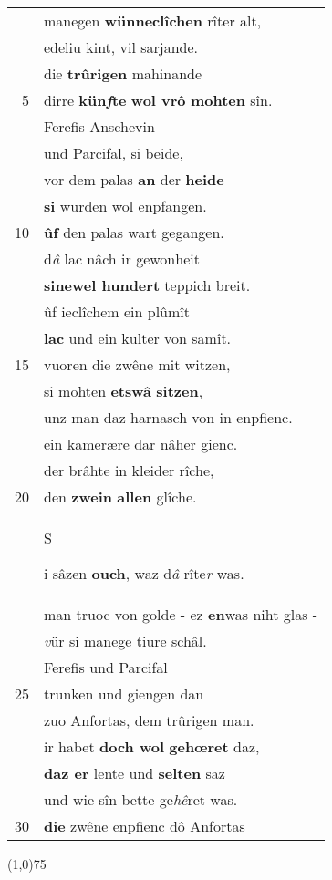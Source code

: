 \documentclass[8pt,a4paper,notitlepage]{article}
\begin{document}
\begin{table}[ht]
\begin{minipage}[t]{0.5\linewidth}
\begin{tabular}{rl}
 & manegen \textbf{wünneclîchen} rîter alt,\\ 
 & edeliu kint, vil sarjande.\\ 
 & die \textbf{trûrigen} mahinande\\ 
5 & dirre \textbf{kün\textit{f}te} \textbf{wol vrô} \textbf{mohten} sîn.\\ 
 & Ferefis Anschevin\\ 
 & und Parcifal, si beide,\\ 
 & vor dem palas \textbf{an} der \textbf{heide}\\ 
 & \textbf{si} wurden wol enpfangen.\\ 
10 & \textbf{ûf} den palas wart gegangen.\\ 
 & d\textit{â} lac nâch ir gewonheit\\ 
 & \textbf{sinewel hundert} teppich breit.\\ 
 & ûf ieclîchem ein plûmît\\ 
 & \textbf{lac} und ein kulter von samît.\\ 
15 & vuoren die zwêne mit witzen,\\ 
 & si mohten \textbf{etswâ} \textbf{sitzen},\\ 
 & unz man daz harnasch von in enpfienc.\\ 
 & ein kamerære dar nâher gienc.\\ 
 & der brâhte in kleider rîche,\\ 
20 & den \textbf{zwein} \textbf{allen} glîche.\\ 
 & \begin{large}S\end{large}i sâzen \textbf{ouch}, waz d\textit{â} rîte\textit{r} was.\\ 
 & man truoc von golde - ez \textbf{en}was niht glas -\\ 
 & \textit{v}ür si manege tiure schâl.\\ 
 & Ferefis und Parcifal\\ 
25 & trunken und giengen dan\\ 
 & zuo Anfortas, dem trûrigen man.\\ 
 & ir habet \textbf{doch wol} \textbf{gehœret} daz,\\ 
 & \textbf{daz er} lente und \textbf{selten} saz\\ 
 & und wie sîn bette ge\textit{hê}ret was.\\ 
30 & \textbf{die} zwêne enpfienc dô Anfortas\\ 
\end{tabular}
\scriptsize
\line(1,0){75} \newline

\end{minipage}
\end{table}
\end{document}
